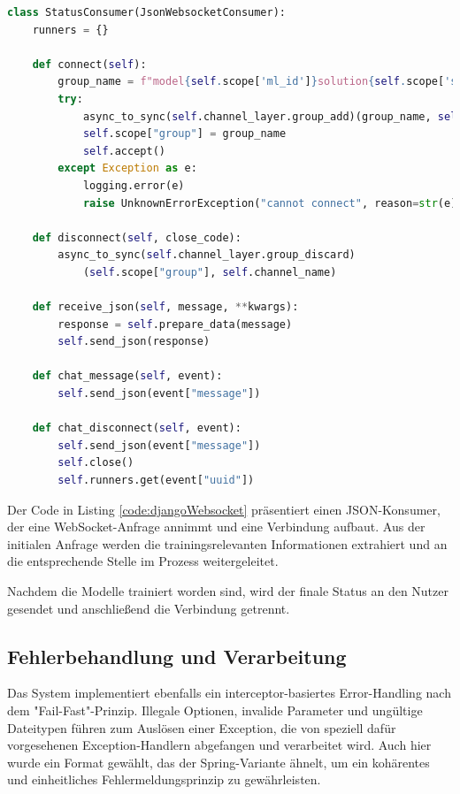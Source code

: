\begin{lstlisting}[language=Python, caption={Websocket Konsumer}, label={code:djangoWebsocket}]
    class StatusConsumer(JsonWebsocketConsumer):
    runners = {}

    def connect(self):
        group_name = f"model{self.scope['ml_id']}solution{self.scope['sol_id']}"
        try:
            async_to_sync(self.channel_layer.group_add)(group_name, self.channel_name)
            self.scope["group"] = group_name
            self.accept()
        except Exception as e:
            logging.error(e)
            raise UnknownErrorException("cannot connect", reason=str(e))

    def disconnect(self, close_code):
        async_to_sync(self.channel_layer.group_discard)
            (self.scope["group"], self.channel_name)

    def receive_json(self, message, **kwargs):
        response = self.prepare_data(message)
        self.send_json(response)

    def chat_message(self, event):
        self.send_json(event["message"])

    def chat_disconnect(self, event):
        self.send_json(event["message"])
        self.close()
        self.runners.get(event["uuid"])
\end{lstlisting}

Der Code in Listing \ref{code:djangoWebsocket} präsentiert einen JSON-Konsumer, der eine WebSocket-Anfrage annimmt und eine Verbindung aufbaut. Aus der initialen 
Anfrage werden die trainingsrelevanten Informationen extrahiert und an die entsprechende Stelle im Prozess weitergeleitet.

Nachdem die Modelle trainiert worden sind, wird der finale Status an den Nutzer gesendet und anschließend die Verbindung getrennt.

\subsection{Fehlerbehandlung und Verarbeitung}
Das System implementiert ebenfalls ein interceptor-basiertes Error-Handling nach dem "Fail-Fast"-Prinzip. Illegale Optionen, invalide Parameter und ungültige Dateitypen führen zum Auslösen einer 
Exception, die von speziell dafür vorgesehenen Exception-Handlern abgefangen und verarbeitet wird. Auch hier wurde ein Format gewählt, das der Spring-Variante ähnelt, um ein kohärentes und einheitliches 
Fehlermeldungsprinzip zu gewährleisten.

